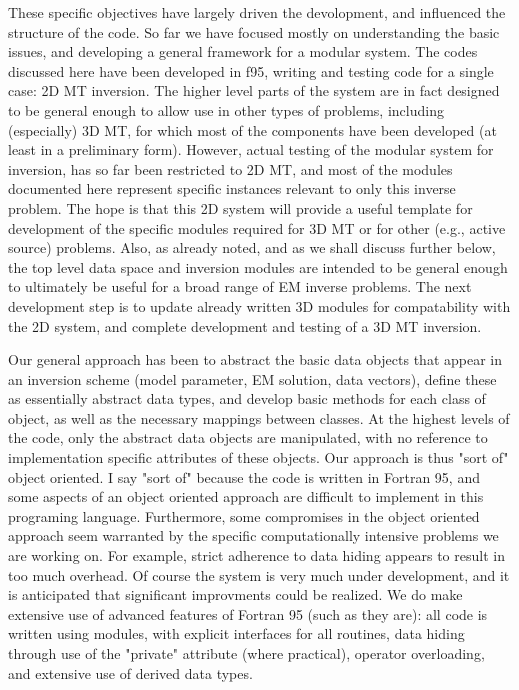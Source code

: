 \documentclass[12pt]{article}
\begin{document}
These specific objectives have largely driven the devolopment, and
influenced the structure of the code.
So far we have focused mostly on understanding the basic issues,
and developing a general framework for a modular system.  The
codes discussed here have been developed in f95, writing and
testing code for a single case: 2D MT inversion.  The higher level parts of the system
are in fact designed to be general enough to allow use in other types
of problems, including (especially) 3D MT, for which most of the
components have been developed (at least in a preliminary form).
However, actual testing of the modular system for inversion,
has so far been restricted to 2D MT,
and  most of the modules documented here represent
specific instances relevant to only this inverse problem.  
The hope is that this 2D system will provide a useful
template for development of the specific modules required for 
3D MT or for other (e.g., active source) problems.  
Also, as already noted, and as we shall discuss further below, 
the top level data space and inversion modules are intended
to be general enough to ultimately be useful for a broad range of
EM inverse problems.  The next development step is to update 
already written 3D modules for compatability with the 2D system, 
and complete development and testing of a 3D MT inversion.

Our general approach has been to abstract the basic data objects that appear
in an inversion scheme (model parameter, EM solution, data vectors),
define these as essentially abstract data types, and develop basic
methods for each class of object, as well as the necessary mappings
between classes.  At the highest levels of the code, only the abstract
data objects are manipulated, with no reference to implementation specific
attributes of these objects.  Our approach is thus "sort of" object oriented.
I say "sort of" because the code is written in Fortran 95,
and some aspects of an object oriented approach are difficult to
implement in this programing language.  Furthermore, some 
compromises in the object oriented approach seem warranted by 
the specific computationally intensive problems we are working on.
For example, strict adherence to data hiding appears to result
in too much overhead.  Of course the system is very much under development,
and it is anticipated that significant improvments could be realized.
We do make extensive use of advanced features of Fortran 95 (such as they are):
all code is written using modules, with explicit interfaces for all routines,
data hiding through use of the "private" attribute (where practical),
operator overloading, and extensive use of derived data types.
\end{document}
